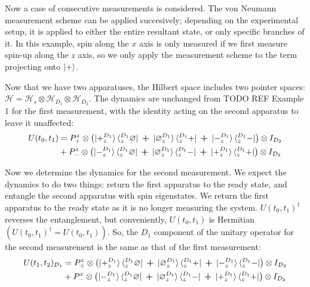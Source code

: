 Now a case of consecutive measurements is considered. The von Neumann measurement scheme can be applied succesively; depending on the experimental setup, it is applied to either the entire resultant state, or only specific branches of it. In this example, spin along the $x$ axis is only measured if we first measure spin-up along the $z$ axis, so we only apply the measurement scheme to the term projecting onto ${\ket{+}}$.

Now that we have two apparatuses, the Hilbert space includes two pointer spaces: $\mathcal{H} = \mathcal{H}_s \otimes \mathcal{H}_{D_1} \otimes \mathcal{H}_{D_2}$. The dynamics are unchanged from TODO REF Example 1 for the first measurement, with the identity acting on the second apparatus to leave it unaffected:
\begin{align}
  U(t_0, t_1) &= P^z_+ \otimes \left(\ket{+^{D_1}_z}\bra{^{D_1}_z\varnothing} \: \bm{+} \: \ket{\varnothing^{D_1}_z}\bra{^{D_1}_z+} \: \bm{+} \: \ket{-^{D_1}_z}\bra{^{D_1}_z-} \right) \otimes I_{D_2} \\ \nonumber
    &+ P^z_- \otimes \left(\ket{-^{D_1}_z}\bra{^{D_1}_z\varnothing} \: \bm{+} \: \ket{\varnothing^{D_1}_z}\bra{^{D_1}_z-} \: \bm{+} \: \ket{+^{D_1}_z}\bra{^{D_1}_z+} \right) \otimes I_{D_2}
\end{align}

Now we determine the dynamics for the second measurement. We expect the dynamics to do two things: return the first apparatus to the ready state, and entangle the second apparatus with spin eigenstates. We return the first apparatus to the ready state as it is no longer measuring the system. $U(t_0, t_1)^\dagger$ reverses the entanglement, but conveniently, $U(t_0, t_1)$ is Hermitian $\left(U(t_0, t_1)^\dagger = U(t_0, t_1)\right)$. So, the $D_1$ component of the unitary operator for the second measurement is the same as that of the first measurement:
\begin{align}
  U(t_1, t_2)_{D_1} &= P^z_+ \otimes \left(\ket{+^{D_1}_z}\bra{^{D_1}_z\varnothing} \: \bm{+} \: \ket{\varnothing^{D_1}_z}\bra{^{D_1}_z+} \: \bm{+} \: \ket{-^{D_1}_z}\bra{^{D_1}_z-} \right) \otimes I_{D_2}  \\ \nonumber
    &+ P^z_- \otimes \left(\ket{-^{D_1}_z}\bra{^{D_1}_z\varnothing} \: \bm{+} \: \ket{\varnothing^{D_1}_z}\bra{^{D_1}_z-} \: \bm{+} \: \ket{+^{D_1}_z}\bra{^{D_1}_z+} \right) \otimes I_{D_2}
\end{align}

